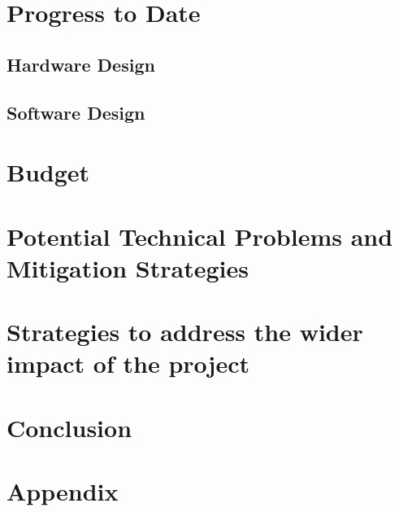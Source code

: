 \documentclass[letterpaper,12pt]{article}
\begin{document}
\section{Progress to Date} %
\subsection{Hardware Design}
\subsection{Software Design}

\section{Budget} %

\section{Potential Technical Problems and Mitigation Strategies}
\section{Strategies to address the wider impact of the project}
\section{Conclusion}

\newpage


\newpage

\section{Appendix}
\end{document}
